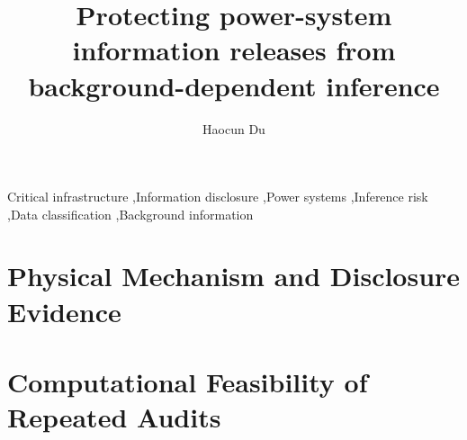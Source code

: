 \documentclass[preprint,11pt,a4paper]{elsarticle}
\begin{document}
\begin{frontmatter}
\title{Protecting power-system information releases from background-dependent inference}
\author{Haocun Du}

\begin{keyword}
Critical infrastructure \sep Information disclosure \sep Power systems \sep Inference risk \sep Data classification \sep Background information
\end{keyword}
\end{frontmatter}






\section{Physical Mechanism and Disclosure Evidence}\label{sec:results}





\section{Computational Feasibility of Repeated Audits}

\FloatBarrier


\FloatBarrier
\appendix

\FloatBarrier


\end{document}
